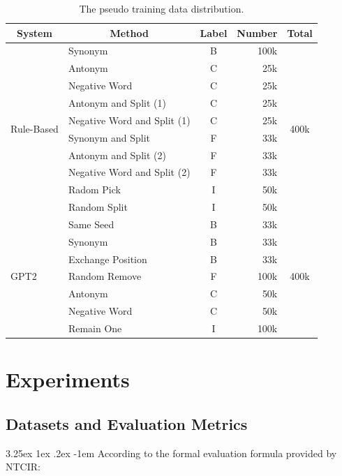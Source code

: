\documentclass[12pt]{article}
\makeatletter
\renewcommand\paragraph{\@startsection{paragraph}{5}{\z@}%
  {3.25ex \@plus1ex \@minus.2ex}%
  {-1em}%
  {\normalfont\normalsize\bfseries}}
\makeatother
\begin{document}
\begin{CJK*}{UTF8}{bkai}
\begin{spacing}{1.77}
\begin{table}[H]
  \centering
  \setlength{\extrarowheight}{-3pt}
  \begin{tabular}{|l|l|c|r|c|}
  \hline
  \multicolumn{1}{|c|}{System} & \multicolumn{1}{c|}{Method} & Label & \multicolumn{1}{c|}{Number} & Total \\ \hline
  \multirow{10}{*}{Rule-Based} & Synonym & B & 100k & \multirow{10}{*}{400k} \\ \cline{2-4}
   & Antonym & C & 25k &  \\ \cline{2-4}
   & Negative Word & C & 25k &  \\ \cline{2-4}
   & Antonym and Split (1) & C & 25k &  \\ \cline{2-4}
   & Negative Word and Split (1) & C & 25k &  \\ \cline{2-4}
   & Synonym and Split & F & 33k &  \\ \cline{2-4}
   & Antonym and Split (2) & F & 33k &  \\ \cline{2-4}
   & Negative Word and Split (2) & F & 33k &  \\ \cline{2-4}
   & Radom Pick & I & 50k &  \\ \cline{2-4}
   & Random Split & I & 50k &  \\ \hline
  \multirow{7}{*}{GPT2} & Same Seed & B & 33k & \multirow{7}{*}{400k} \\ \cline{2-4}
   & Synonym & B & 33k &  \\ \cline{2-4}
   & Exchange Position & B & 33k &  \\ \cline{2-4}
   & Random Remove & F & 100k &  \\ \cline{2-4}
   & Antonym & C & 50k &  \\ \cline{2-4}
   & Negative Word & C & 50k &  \\ \cline{2-4}
   & Remain One & I & 100k &  \\ \hline
  \end{tabular}
  \caption{The pseudo training data distribution.}
  \label{table:pseudo_training_data_dist}
\end{table}

\section{Experiments} \label{section:experiments}
\subsection{Datasets and Evaluation Metrics}
\paragraph{}
According to the formal evaluation formula provided by NTCIR:


\end{spacing}
\end{CJK*}
\end{document}
